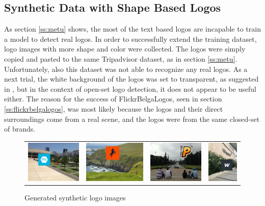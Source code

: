 \subsection{Synthetic Data with Shape Based Logos}

As section \ref{ss:metu} shows, the most of the text based logos are incapable to train a model to detect real logos. In order to successfully extend the training dataset, logo images with more shape and color \cite{LogoClearbit} were collected. The logos were simply copied and pasted to the same Tripadvisor dataset, as in section \ref{ss:metu}. Unfortunately, also this dataset was not able to recognize any real logos. As a next trial, the white background of the logos was set to transparent, as suggested in \cite{DBLP:journals/corr/SuZG16}, but in the context of open-set logo detection, it does not appear to be useful either. The reason for the success of FlickrBelgaLogos, seen in section \ref{ss:flickrbelgalogos}, was most likely because the logos and their direct surroundings come from a real scene, and the logos were from the same closed-set of brands.
\bigbreak
\begin{figure}
  \centering
\begin{tabular}{cccc}
  \includegraphics[height=20mm]{images/mt/clearbit1.jpg} &   \includegraphics[height=20mm]{images/mt/clearbit2.jpg}  & \includegraphics[height=20mm]{images/mt/clearbit3.jpg} &   \includegraphics[height=20mm]{images/mt/clearbit4.jpg}
\end{tabular}
\caption{Generated synthetic logo images}
\label{f:synlogo}
\end{figure}
\bigbreak
